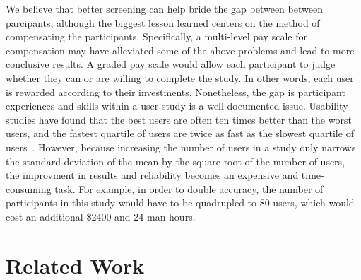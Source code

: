 \documentclass[11pt, letterpaper, onecolumn]{article}
\begin{document}
We  believe that  better  screening  can help  bride  the gap  between
between parcipants, although the biggest lesson learned centers on the
method of compensating  the participants.  Specifically, a multi-level
pay  scale for  compensation may  have  alleviated some  of the  above
problems and lead to more conclusive results. A graded pay scale would
allow each  participant to  judge whether they  can or are  willing to
complete the study. In other words, each user is rewarded according to
their  investments.  Nonetheless, the  gap is  participant experiences
and skills within a user  study is a well-documented issue.  Usability
studies have found that the best users are often ten times better than
the worst users,  and the fastest quartile of users  are twice as fast
as   the  slowest   quartile   of  users~\cite{controlled-experiments,
research-issues}.  However, because increasing  the number of users in
a study only narrows the standard  deviation of the mean by the square
root   of  the   number  of   users\cite{controlled-experiments},  the
improvment  in  results  and  reliability  becomes  an  expensive  and
time-consuming task.   For example, in  order to double  accuracy, the
number of participants in this study would have to be quadrupled to 80
users, which would cost an additional \$2400 and 24 man-hours.



\section{Related Work}
\label{sec:rw}
\end{document}
